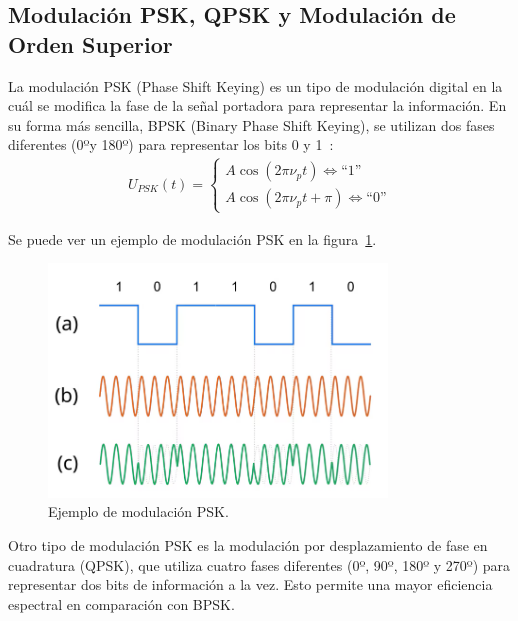 \documentclass[12pt, letterpaper]{article}
\begin{document}
\subsection{Modulación PSK, QPSK y Modulación de Orden Superior}
La modulación PSK (Phase Shift Keying) es un tipo de modulación digital en la cuál se modifica la fase de la señal portadora para representar la información. En su forma más sencilla, BPSK (Binary Phase Shift Keying), se utilizan dos fases diferentes (0ºy 180º) para representar los bits 0 y 1~\cite{modulacion-uv}:
\begin{align}
    U_{PSK}(t) =
    \left\{
    \begin{array}{l}
        A \cos(2\pi\nu_p t) \Leftrightarrow \text{``1''} \\
        A \cos(2\pi\nu_p t + \pi) \Leftrightarrow \text{``0''}
    \end{array}
    \right.
\end{align}

Se puede ver un ejemplo de modulación PSK en la figura~\ref{fig:psk}.
\begin{figure}[h]
    \centering
    \includegraphics[width=9cm]{images/PSK.png}
    \caption{Ejemplo de modulación PSK.\label{fig:psk}}
\end{figure}

Otro tipo de modulación PSK es la modulación por desplazamiento de fase en cuadratura (QPSK), que utiliza cuatro fases diferentes (0º, 90º, 180º y 270º) para representar dos bits de información a la vez. Esto permite una mayor eficiencia espectral en comparación con BPSK.\@
\end{document}
